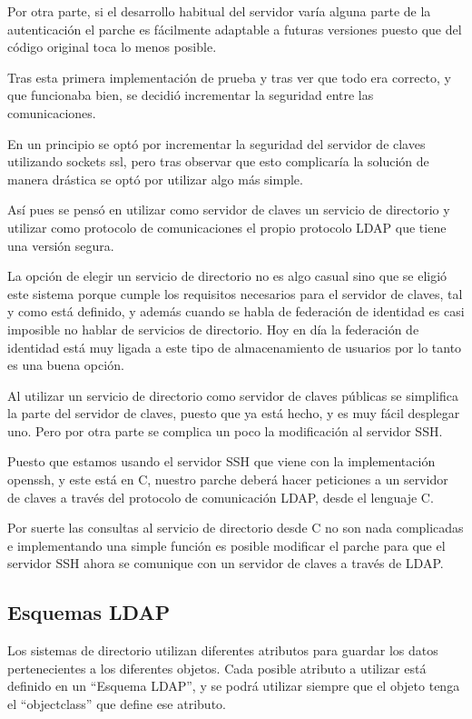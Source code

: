     Por otra parte, si el desarrollo habitual del servidor varía alguna
    parte de la autenticación el parche es fácilmente adaptable a futuras
    versiones puesto que del código original toca lo menos posible.

    Tras esta primera implementación de prueba y tras ver que todo era
    correcto, y que funcionaba bien, se decidió incrementar la seguridad
    entre las comunicaciones.

    En un principio se optó por incrementar la seguridad del servidor de
    claves utilizando sockets ssl, pero tras observar que esto complicaría
    la solución de manera drástica se optó por utilizar algo más simple.

    Así pues se pensó en utilizar como servidor de claves un servicio de
    directorio y utilizar como protocolo de comunicaciones el propio
    protocolo LDAP que tiene una versión segura.

    La opción de elegir un servicio de directorio no es algo casual sino
    que se eligió este sistema porque cumple los requisitos necesarios para
    el servidor de claves, tal y como está definido, y además cuando se
    habla de federación de identidad es casi imposible no hablar de
    servicios de directorio. Hoy en día la federación de identidad está muy
    ligada a este tipo de almacenamiento de usuarios por lo tanto es una
    buena opción.

    Al utilizar un servicio de directorio como servidor de claves públicas
    se simplifica la parte del servidor de claves, puesto que ya está
    hecho, y es muy fácil desplegar uno. Pero por otra parte se complica un
    poco la modificación al servidor SSH.

    Puesto que estamos usando el servidor SSH que viene con la
    implementación openssh, y este está en C, nuestro parche deberá hacer
    peticiones a un servidor de claves a través del protocolo de
    comunicación LDAP, desde el lenguaje C.

    Por suerte las consultas al servicio de directorio desde C no son nada
    complicadas e implementando una simple función es posible modificar el
    parche para que el servidor SSH ahora se comunique con un servidor de
    claves a través de LDAP.

    \subsection{Esquemas LDAP}

    Los sistemas de directorio utilizan diferentes atributos para guardar los
    datos pertenecientes a los diferentes objetos. Cada posible atributo a
    utilizar está definido en un ``Esquema LDAP'', y se podrá utilizar
    siempre que el objeto tenga el ``objectclass'' que define ese atributo.

